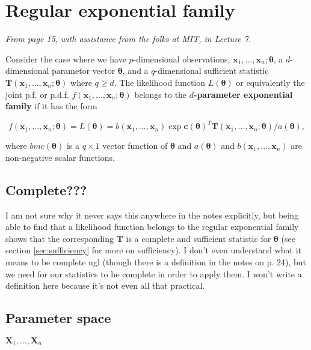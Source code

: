 \section{Regular exponential family}\label{sec:reg exp fam}

\textit{From page 15, with assistance from the folks at MIT, \autocite{MIT} in Lecture 7.}

Consider the case where we have \(p\)-dimensional observations, \(\bm{x}_1,...,\bm{x}_n;\bm{\theta}\), 
a \(d\)-dimensional parametor vector \(\bm{\theta}\), 
and a \(q\)-dimensional sufficient statistic \(\bm{T}(\bm{x}_1,...,\bm{x}_n;\bm{\theta})\) where \(q\geq d\). 
The likelihood function \(L(\bm{\theta})\) or equivalently the joint 
p.f. or p.d.f. \(f(\bm{x}_1,...,\bm{x}_n;\bm{\theta})\) belongs to the 
\textbf{\(d\)-parameter exponential family} if it has the form

\begin{equation}\label{eq:exp family}
    f(\bm{x}_1,...,\bm{x}_n;\bm{\theta}) = L(\bm{\theta}) = b(\bm{x}_1,...,\bm{x}_n)\exp{\bm{c}(\bm{\theta})^T \bm{T}(\bm{x}_1,...,\bm{x}_n;\bm{\theta})/a(\bm{\theta})},
\end{equation}

where \(bm{c}(\bm{\theta})\) is a \(q\times 1\) vector function of \(\bm{\theta}\) and \(a(\bm{\theta})\) and \(b(\bm{x}_1,...,\bm{x}_n)\) 
are non-negative scalar functions. 


\subsection{Complete???}\label{sec:complete}

I am not sure why it never says this anywhere in the notes explicitly, but being able to find that a likelihood function belongs to the regular exponential family shows that the corresponding \(\bm{T}\) is a complete and sufficient statistic for \(\bm{\theta}\) (see section \ref{sec:sufficiency} for more on sufficiency). 
I don't even understand what it means to be complete ngl (though there is a definition in the notes on p. 24), but we need for our statistics to be complete in order to apply them. 
I won't write a definition here because it's not even all that practical. 

\subsection{Parameter space}\label{sec:param space}

\(\bm{X}_1,...,\bm{X}_n\)




